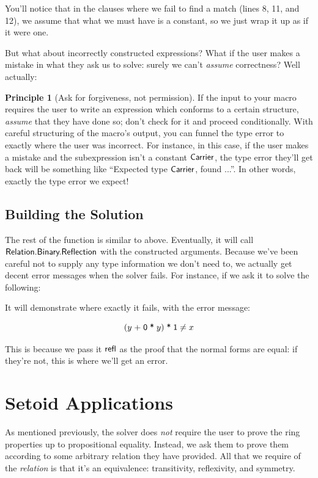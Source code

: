 \documentclass[draft, twocolumn]{article}
\theoremstyle{definition}
\theoremstyle{definition}
\newtheorem{principle}{Principle}[section]
\begin{document}
You'll notice that in the clauses where we fail to find a match (lines 8, 11,
and 12), we assume that what we must have is a constant, so we just wrap it up
as if it were one. 

But what about incorrectly constructed expressions? What if the user makes a
mistake in what they ask us to solve: surely we can't \emph{assume} correctness?
Well actually:

\begin{principle}[Ask for forgiveness, not permission]
  If the input to your macro requires the user to write an expression which
  conforms to a certain structure, \emph{assume} that they have done so; don't
  check for it and proceed conditionally. With careful structuring of the
  macro's output, you can funnel the type error to exactly where the user was
  incorrect. For instance, in this case, if the user makes a mistake and the
  subexpression isn't a constant \(\AgdaDatatype{Carrier}\), the type error
  they'll get back will be something like ``Expected type
  \(\AgdaDatatype{Carrier}\), found ...''. In other words, exactly the type
  error we expect!
\end{principle}

\subsection{Building the Solution}
The rest of the function is similar to above. Eventually, it will call
\(\AgdaModule{Relation.Binary.Reflection}\) with the constructed arguments.
Because we've been careful not to supply any type information we don't need to,
we actually get decent error messages when the solver fails. For instance, if we
ask it to solve the following:


It will demonstrate where exactly it fails, with the error message:

\[
 (y \; \AgdaFunction{+} \; \AgdaNumber{0} \; \AgdaFunction{*} \; y) \;
 \AgdaFunction{*} \;
 \AgdaNumber{1} \neq x
\]

This is because we pass it \(\AgdaField{refl}\) as the proof that the normal
forms are equal: if they're not, this is where we'll get an error.
\section{Setoid Applications} \label{equivalence}
As mentioned previously, the solver does \emph{not} require the user to prove
the ring properties up to propositional equality. Instead, we ask them to prove
them according to some arbitrary relation they have provided. All that we
require of the \emph{relation} is that it's an equivalence: transitivity,
reflexivity, and symmetry.
\end{document}
